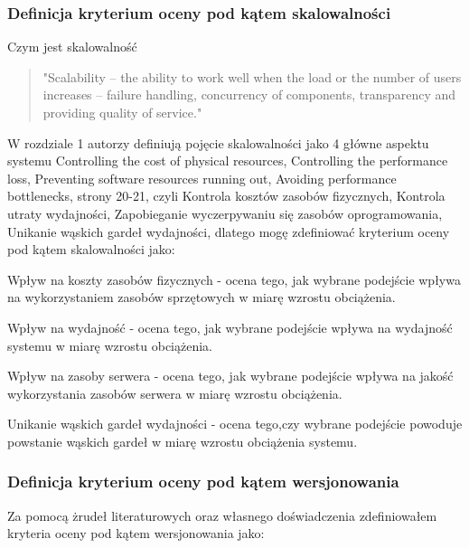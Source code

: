 \documentclass[runningheads,12pt]{llncs}
\begin{document}
\subsubsection{Definicja kryterium oceny pod kątem skalowalności}

Czym jest skalowalność 

\begin{quote}
    "Scalability – the ability to work well when the load or the number of users increases – failure handling, concurrency of components, transparency and providing quality of service." ~\cite[p. 21]{coulouris2011distributed}
\end{quote}

W rozdziale 1 autorzy definiują pojęcie skalowalności jako 4 główne aspektu systemu Controlling the cost of physical resources, Controlling the performance loss, Preventing software resources running out, Avoiding performance bottlenecks, strony 20-21, czyli Kontrola kosztów zasobów fizycznych, Kontrola utraty wydajności, Zapobieganie wyczerpywaniu się zasobów oprogramowania, Unikanie wąskich gardeł wydajności, dlatego mogę zdefiniować kryterium oceny pod kątem skalowalności jako:

Wpływ na koszty zasobów fizycznych - ocena tego, jak wybrane podejście wpływa na  wykorzystaniem zasobów sprzętowych w miarę wzrostu obciążenia.

Wpływ na wydajność - ocena tego, jak wybrane podejście wpływa na wydajność systemu w miarę wzrostu obciążenia.

Wpływ na zasoby serwera - ocena tego, jak wybrane podejście wpływa na jakość wykorzystania zasobów serwera w miarę wzrostu obciążenia.

Unikanie wąskich gardeł wydajności - ocena tego,czy wybrane podejście powoduje powstanie wąskich gardeł  w miarę wzrostu obciążenia systemu.

\subsubsection{Definicja kryterium oceny pod kątem wersjonowania}

Za pomocą żrudeł literaturowych oraz własnego doświadczenia zdefiniowałem kryteria oceny pod kątem wersjonowania jako: 
\end{document}
